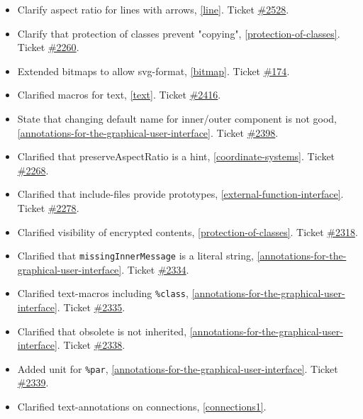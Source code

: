 \begin{itemize}
\begin{itemize}
\item Clarify aspect ratio for lines with arrows, \cref{line}.
Ticket \href{https://github.com/modelica/ModelicaSpecification/issues/2528}{\#2528}.
\item Clarify that protection of classes prevent "copying", \cref{protection-of-classes}.
Ticket \href{https://github.com/modelica/ModelicaSpecification/issues/2260}{\#2260}.
\item Extended bitmaps to allow svg-format, \cref{bitmap}.
Ticket \href{https://github.com/modelica/ModelicaSpecification/issues/174}{\#174}.
\item Clarified macros for text, \cref{text}.
Ticket \href{https://github.com/modelica/ModelicaSpecification/issues/2416}{\#2416}.
\item State that changing default name for inner/outer component is not good, \cref{annotations-for-the-graphical-user-interface}.
Ticket \href{https://github.com/modelica/ModelicaSpecification/issues/2398}{\#2398}.
\item Clarified that preserveAspectRatio is a hint, \cref{coordinate-systems}.
Ticket \href{https://github.com/modelica/ModelicaSpecification/issues/2268}{\#2268}.
\item Clarified that include-files provide prototypes, \cref{external-function-interface}.
Ticket \href{https://github.com/modelica/ModelicaSpecification/issues/2278}{\#2278}.
\item Clarified visibility of encrypted contents, \cref{protection-of-classes}.
Ticket \href{https://github.com/modelica/ModelicaSpecification/issues/2318}{\#2318}.
\item Clarified that \lstinline!missingInnerMessage! is a literal string, \cref{annotations-for-the-graphical-user-interface}.
Ticket \href{https://github.com/modelica/ModelicaSpecification/issues/2334}{\#2334}.
\item Clarified text-macros including \lstinline!%class!, \cref{annotations-for-the-graphical-user-interface}.
Ticket \href{https://github.com/modelica/ModelicaSpecification/issues/2335}{\#2335}.
\item Clarified that obsolete is not inherited, \cref{annotations-for-the-graphical-user-interface}.
Ticket \href{https://github.com/modelica/ModelicaSpecification/issues/2338}{\#2338}.
\item Added unit for \lstinline!%par!, \cref{annotations-for-the-graphical-user-interface}.
Ticket \href{https://github.com/modelica/ModelicaSpecification/issues/2339}{\#2339}.
\item Clarified text-annotations on connections, \cref{connections1}.

\end{itemize}
\end{itemize}
